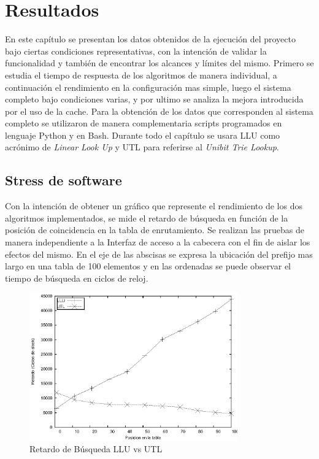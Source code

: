 \chapter{Resultados}

En este capítulo se presentan los datos obtenidos de la ejecución del proyecto bajo ciertas condiciones representativas, con la intención de validar la funcionalidad y también de encontrar los alcances y límites del mismo. Primero se estudia el tiempo de respuesta de los algoritmos de manera individual, a continuación el rendimiento en la configuración mas simple, luego el sistema completo bajo condiciones varias, y por ultimo se analiza la mejora introducida por el uso de la cache. Para la obtención de los datos que corresponden al sistema completo se utilizaron de manera complementaria scripts programados en lenguaje Python y en Bash. Durante todo el capítulo se usara LLU como acrónimo de \textit{Linear Look Up} y UTL para referirse al \textit{Unibit Trie Lookup}. 


\section{Stress de software}

Con la intención de obtener un gráfico que represente el rendimiento de los dos algoritmos implementados, se mide el retardo de búsqueda en función de la posición de coincidencia en la tabla de enrutamiento. Se realizan las pruebas de manera independiente a la Interfaz de acceso a la cabecera con el fin de aislar los efectos del mismo. En el eje de las abscisas se expresa la ubicación del prefijo mas largo en una tabla de 100 elementos  y en las ordenadas se puede observar el tiempo de búsqueda en ciclos de reloj.

\begin{figure}[h]
  \centering
	\includegraphics[width=0.8\textwidth]{5-resultados/graf/llu-utlsof.eps}
  \caption{Retardo de Búsqueda LLU vs UTL}
  \label{fig}
\end{figure}

